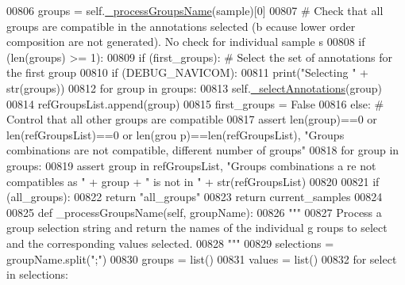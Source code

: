 \begin{DoxyCode}
00806             groups = self.\hyperlink{classnavicom_1_1navicom_1_1NaviCom_a1b8f14be167905533ab7e18294dd9100}{_processGroupsName}(sample)[0]
00807             \textcolor{comment}{# Check that all groups are compatible in the annotations selected (b
      ecause lower order composition are not generated). No check for individual sample
      s}
00808             \textcolor{keywordflow}{if} (len(groups) >= 1):
00809                 \textcolor{keywordflow}{if} (first\_groups): \textcolor{comment}{# Select the set of annotations for the first 
      group}
00810                     \textcolor{keywordflow}{if} (DEBUG\_NAVICOM):
00811                         \textcolor{keywordflow}{print}(\textcolor{stringliteral}{"Selecting "} + str(groups))
00812                     \textcolor{keywordflow}{for} group \textcolor{keywordflow}{in} groups:
00813                         self.\hyperlink{classnavicom_1_1navicom_1_1NaviCom_a7e1aa831f14b151b7b5787c8b6128cef}{_selectAnnotations}(group) 
00814                         refGroupsList.append(group)
00815                         first\_groups = \textcolor{keyword}{False}
00816                 \textcolor{keywordflow}{else}: \textcolor{comment}{# Control that all other groups are compatible}
00817                         \textcolor{keyword}{assert} len(group)==0 \textcolor{keywordflow}{or} len(refGroupsList)==0 \textcolor{keywordflow}{or} len(grou
      p)==len(refGroupsList), \textcolor{stringliteral}{"Groups combinations are not compatible, different number
       of groups"}
00818                         \textcolor{keywordflow}{for} group \textcolor{keywordflow}{in} groups:
00819                             \textcolor{keyword}{assert} group \textcolor{keywordflow}{in} refGroupsList, \textcolor{stringliteral}{"Groups combinations a
      re not compatibles as "} + group + \textcolor{stringliteral}{" is not in "} + str(refGroupsList)
00820 
00821         \textcolor{keywordflow}{if} (all\_groups):
00822             \textcolor{keywordflow}{return} \textcolor{stringliteral}{"all\_groups"}
00823         \textcolor{keywordflow}{return} current\_samples
00824 
00825     \textcolor{keyword}{def }\_processGroupsName(self, groupName):
00826         \textcolor{stringliteral}{"""}
00827 \textcolor{stringliteral}{        Process a group selection string and return the names of the individual g
      roups to select and the corresponding values selected.}
00828 \textcolor{stringliteral}{        """}
00829         selections = groupName.split(\textcolor{stringliteral}{";"})
00830         groups = list()
00831         values = list()
00832         \textcolor{keywordflow}{for} select \textcolor{keywordflow}{in} selections:

\end{DoxyCode}
